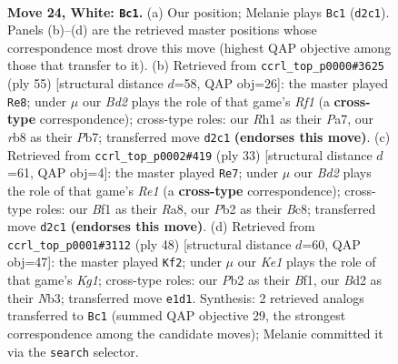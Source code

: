\documentclass[11pt]{article}
\begin{document}
\clearpage

\begin{figure}[p]\centering
\begin{subfigure}{0.46\textwidth}\centering
\resizebox{\linewidth}{!}{%
\newchessgame
\chessboard[
  setfen={1rb2r2/p1pp1pk1/2n5/2R1p2p/8/5PP1/PP1B1P1P/4KB1R w - - 0 24},
  showmover=false,
  pgfstyle=straightmove, color=movearrow, markmove={d2-c1}
]}
\caption{}
\end{subfigure}\hfill
\begin{subfigure}{0.46\textwidth}\centering
\resizebox{\linewidth}{!}{%
\newchessgame
\chessboard[
  setfen={5rk1/pp1b1n1p/4p1p1/3pb3/3N3P/1P1R4/P2B1PP1/4R1K1 b - - 0 28},
  showmover=false,
  pgfstyle=straightmove, color=movearrow, markmove={f8-e8}
]}
\caption{}
\end{subfigure}
\\[4pt]
\begin{subfigure}{0.46\textwidth}\centering
\resizebox{\linewidth}{!}{%
\newchessgame
\chessboard[
  setfen={r1b1r1k1/pp1n1pp1/3p3p/3P4/5N2/5BP1/PP1KP2P/R1R5 b - - 0 17},
  showmover=false,
  pgfstyle=straightmove, color=movearrow, markmove={e8-e7}
]}
\caption{}
\end{subfigure}\hfill
\begin{subfigure}{0.46\textwidth}\centering
\resizebox{\linewidth}{!}{%
\newchessgame
\chessboard[
  setfen={3r2k1/1p1b1ppp/1nnRp3/p7/4PP2/1N4P1/P6P/2B2BK1 w - - 2 25},
  showmover=false,
  pgfstyle=straightmove, color=movearrow, markmove={g1-f2}
]}
\caption{}
\end{subfigure}
\caption{\textbf{Move 24, White: \texttt{Bc1}.} (a) Our position; Melanie plays \texttt{Bc1} (\texttt{d2c1}). Panels (b)--(d) are the retrieved master positions whose correspondence most drove this move (highest QAP objective among those that transfer to it). (b) Retrieved from \texttt{ccrl\_top\_p0000\#3625} (ply 55) [structural distance $d$=58, QAP obj=26]: the master played \texttt{Re8}; under $\mu$ our \emph{Bd2} plays the role of that game's \emph{Rf1} (a \textbf{cross-type} correspondence); cross-type roles: our \emph{R}h1 as their \emph{P}a7, our \emph{r}b8 as their \emph{P}b7; transferred move \texttt{d2c1} \textbf{(endorses this move)}. (c) Retrieved from \texttt{ccrl\_top\_p0002\#419} (ply 33) [structural distance $d$=61, QAP obj=4]: the master played \texttt{Re7}; under $\mu$ our \emph{Bd2} plays the role of that game's \emph{Re1} (a \textbf{cross-type} correspondence); cross-type roles: our \emph{B}f1 as their \emph{R}a8, our \emph{P}b2 as their \emph{B}c8; transferred move \texttt{d2c1} \textbf{(endorses this move)}. (d) Retrieved from \texttt{ccrl\_top\_p0001\#3112} (ply 48) [structural distance $d$=60, QAP obj=47]: the master played \texttt{Kf2}; under $\mu$ our \emph{Ke1} plays the role of that game's \emph{Kg1}; cross-type roles: our \emph{P}b2 as their \emph{B}f1, our \emph{B}d2 as their \emph{N}b3; transferred move \texttt{e1d1}. Synthesis: 2 retrieved analogs transferred to \texttt{Bc1} (summed QAP objective 29, the strongest correspondence among the candidate moves); Melanie committed it via the \texttt{search} selector.}
\label{fig:thought-m46}
\end{figure}
\end{document}
